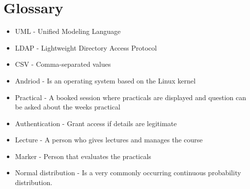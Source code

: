\documentclass[12pt,a4paper]{article}
\begin{document}
\section{Glossary}
\begin{itemize}
\item UML - Unified Modeling Language
\item LDAP - Lightweight Directory Access Protocol
\item CSV - Comma-separated values
\item Andriod - Is an operating system based on the Linux kernel
\item Practical - A booked session where practicals are displayed and question can be asked about the weeks practical
\item Authentication - Grant access if details are legitimate
\item Lecture - A person who gives lectures and manages the course
\item Marker - Person that evaluates the practicals
\item Normal distribution - Is a very commonly occurring continuous probability distribution.
\end{itemize}
\end{document}
